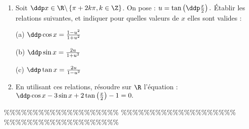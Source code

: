 



\begin{exercice}  \;
\begin{enumerate}
\item Soit $\ddp x \in \R\backslash \left\{ \pi + 2 k \pi, k \in \Z \right\}$. On pose : $u =  \tan \left(\ddp \frac{x}{2} \right).$ \'Etablir les relations suivantes, et indiquer pour quelles valeurs de $x$ elles sont valides :\\
\begin{minipage}[t]{0.3\textwidth}
(a) $\ddp \cos x = \frac{1-u^2}{1+u^2}$
\end{minipage}
\begin{minipage}[t]{0.3\textwidth}
(b)  $\ddp \sin x = \frac{2 u}{1+u^2}$
\end{minipage}
\begin{minipage}[t]{0.3\textwidth}
(c) $\ddp \tan x = \frac{2 u}{1-u^2}$
\end{minipage}
\item En utilisant ces relations, r\'esoudre sur $\R$ l'\'equation : $\ddp \cos x - 3 \sin x + 2\tan \left( \frac{x}{2} \right) - 1 = 0.$
\end{enumerate}
\end{exercice}


\%\%\%\%\%\%\%\%\%\%\%\%\%\%\%\%\%\%\%\%
\%\%\%\%\%\%\%\%\%\%\%\%\%\%\%\%\%\%\%\%
\%\%\%\%\%\%\%\%\%\%\%\%\%\%\%\%\%\%\%\%




